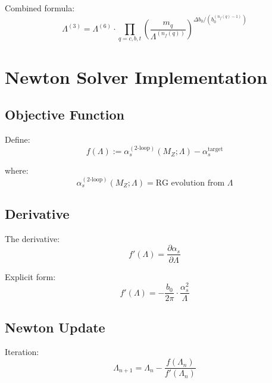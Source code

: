 \documentclass[11pt,a4paper]{article}
\theoremstyle{definition}
\begin{document}
Combined formula:
\begin{equation}
\label{eq:app-chain-combined}
\Lambda^{(3)} = \Lambda^{(6)} \cdot \prod_{q=c,b,t}
  \left(\frac{m_q}{\Lambda^{(n_f(q))}}\right)^{\Delta b_0/(b_0^{(n_f(q)-1)})}
\end{equation}

\section{Newton Solver Implementation}
\label{app:newton-impl}

\subsection{Objective Function}
\label{subsec:obj-func}

Define:
\begin{equation}
\label{eq:app-obj}
f(\Lambda) := \alpha_s^{(\text{2-loop})}(M_Z; \Lambda) - \alpha_s^{\text{target}}
\end{equation}

where:
\begin{equation}
\label{eq:app-alpha-2loop}
\alpha_s^{(\text{2-loop})}(M_Z; \Lambda) = \text{RG evolution from } \Lambda
\end{equation}

\subsection{Derivative}
\label{subsec:derivative}

The derivative:
\begin{equation}
\label{eq:app-deriv}
f'(\Lambda) = \frac{\partial \alpha_s}{\partial \Lambda}
\end{equation}

Explicit form:
\begin{equation}
\label{eq:app-deriv-explicit}
f'(\Lambda) = -\frac{b_0}{2\pi} \cdot \frac{\alpha_s^2}{\Lambda}
\end{equation}

\subsection{Newton Update}
\label{subsec:newton-update}

Iteration:
\begin{equation}
\label{eq:app-newton-update}
\Lambda_{n+1} = \Lambda_n - \frac{f(\Lambda_n)}{f'(\Lambda_n)}
\end{equation}
\end{document}
